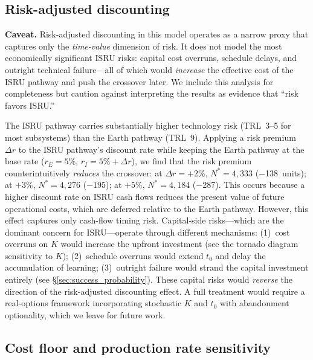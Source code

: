 \documentclass[preprint,12pt]{elsarticle}
\begin{document}
\subsection{Risk-adjusted discounting}
\label{sec:risk_premium}

\textbf{Caveat.} Risk-adjusted discounting in this model operates as a narrow proxy that captures only the \emph{time-value} dimension of risk. It does not model the most economically significant ISRU risks: capital cost overruns, schedule delays, and outright technical failure---all of which would \emph{increase} the effective cost of the ISRU pathway and push the crossover later. We include this analysis for completeness but caution against interpreting the results as evidence that ``risk favors ISRU.''

The ISRU pathway carries substantially higher technology risk (TRL~3--5 for most subsystems) than the Earth pathway (TRL~9). Applying a risk premium $\Delta r$ to the ISRU pathway's discount rate while keeping the Earth pathway at the base rate ($r_E = 5\%$, $r_I = 5\% + \Delta r$), we find that the risk premium counterintuitively \emph{reduces} the crossover: at $\Delta r = +2\%$, $N^* = 4{,}333$ ($-$138~units); at $+3\%$, $N^* = 4{,}276$ ($-$195); at $+5\%$, $N^* = 4{,}184$ ($-$287). This occurs because a higher discount rate on ISRU cash flows reduces the present value of future operational costs, which are deferred relative to the Earth pathway. However, this effect captures only cash-flow timing risk. Capital-side risks---which are the dominant concern for ISRU---operate through different mechanisms: (1)~cost overruns on $K$ would increase the upfront investment (see the tornado diagram sensitivity to $K$); (2)~schedule overruns would extend $t_0$ and delay the accumulation of learning; (3)~outright failure would strand the capital investment entirely (see \S\ref{sec:success_probability}). These capital risks would \emph{reverse} the direction of the risk-adjusted discounting effect. A full treatment would require a real-options framework \cite{dixit1994} incorporating stochastic $K$ and $t_0$ with abandonment optionality, which we leave for future work.

\subsection{Cost floor and production rate sensitivity}
\label{sec:cfloor_prodrate}
\end{document}
